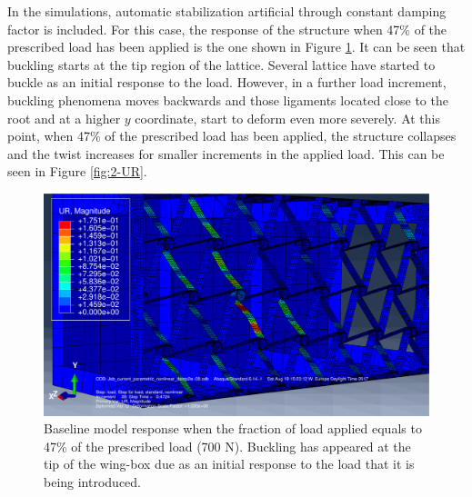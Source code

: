   In the simulations, automatic stabilization artificial through constant damping factor is included. For this case, the response of the structure when 47\% of the prescribed load has been applied is the one shown in Figure \ref{fig:1-UR}. It can be seen that buckling starts at the tip region of the lattice. Several lattice have started to buckle as an initial response to the load. However, in a further load increment, buckling phenomena moves backwards and those ligaments located close to the root and at a higher $y$ coordinate, start to deform even more severely. At this point, when 47\% of the prescribed load has been applied, the structure collapses and the twist increases for smaller increments in the applied load. This can be seen in Figure \ref{fig:2-UR}.

  \begin{figure}[!htpb] %
    \centering
    \includegraphics[width=0.8 \textwidth]{figures/../figures/result-sim/1-UR}
    \caption[Baseline model response when the fraction of load applied equals to 47\% of the prescribed load (700 N)]{Baseline model response when the fraction of load applied equals to 47\% of the prescribed load (700 N). Buckling has appeared at the tip of the wing-box due as an initial response to the load that it is being introduced.}\label{fig:1-UR}
  \end{figure}


